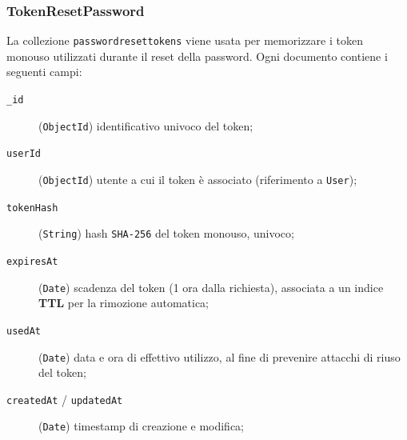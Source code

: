    \subsubsection{TokenResetPassword}
        La collezione \texttt{passwordresettokens} viene usata per memorizzare
        i token monouso utilizzati durante il reset della password. Ogni documento
        contiene i seguenti campi:
        \begin{description}
            \item[\texttt{\_id}] (\texttt{ObjectId}) identificativo univoco del token;
            \item[\texttt{userId}] (\texttt{ObjectId}) utente a cui il token è associato (riferimento a \texttt{User});
            \item[\texttt{tokenHash}] (\texttt{String}) hash \texttt{SHA-256} del token monouso, univoco;
            \item[\texttt{expiresAt}] (\texttt{Date}) scadenza del token (1 ora dalla richiesta), associata a un indice \textbf{TTL} per la rimozione automatica;
            \item[\texttt{usedAt}] (\texttt{Date}) data e ora di effettivo utilizzo, al fine di prevenire attacchi di riuso del token;
            \item[\texttt{createdAt} / \texttt{updatedAt}] (\texttt{Date}) timestamp di creazione e modifica;
        \end{description}
